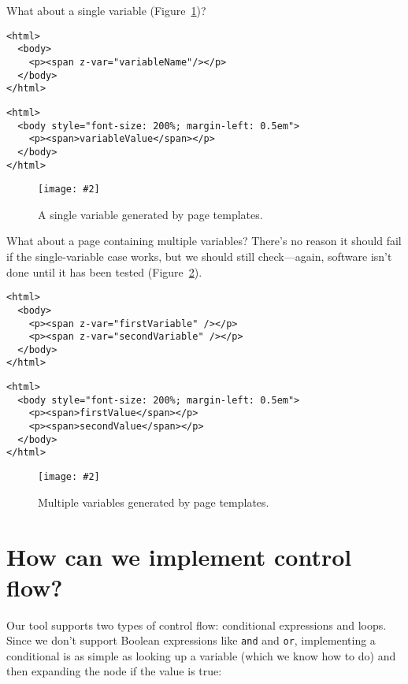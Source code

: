 \documentclass[krantzl]{krantz}
\newcommand{\figpdf}[4]{\begin{figure}%
\centering%
\texttt{[image: \#2]}%
\caption{#3}%
\label{#1}%
\end{figure}}
\newcommand{\figref}[1]{Figure~\ref{#1}}
\begin{document}
What about a single variable (\figref{page-templates-output-single-variable})?


\begin{lstlisting}[frame=tblr,backgroundcolor=\color{black!5}]
<html>
  <body>
    <p><span z-var="variableName"/></p>
  </body>
</html>
\end{lstlisting}



\begin{lstlisting}[frame=tblr,backgroundcolor=\color{black!5}]
<html>
  <body style="font-size: 200%; margin-left: 0.5em">
    <p><span>variableValue</span></p>
  </body>
</html>
\end{lstlisting}


\figpdf{page-templates-output-single-variable}{./page-templates/output-single-variable.pdf}{A single variable generated by page templates.}{0.6}


What about a page containing multiple variables?
There’s no reason it should fail if the single-variable case works,
but we should still check—again,
software isn’t done until it has been tested (\figref{page-templates-output-multiple-variables}).


\begin{lstlisting}[frame=tblr,backgroundcolor=\color{black!5}]
<html>
  <body>
    <p><span z-var="firstVariable" /></p>
    <p><span z-var="secondVariable" /></p>
  </body>
</html>
\end{lstlisting}



\begin{lstlisting}[frame=tblr,backgroundcolor=\color{black!5}]
<html>
  <body style="font-size: 200%; margin-left: 0.5em">
    <p><span>firstValue</span></p>
    <p><span>secondValue</span></p>
  </body>
</html>
\end{lstlisting}


\figpdf{page-templates-output-multiple-variables}{./page-templates/output-multiple-variables.pdf}{Multiple variables generated by page templates.}{0.6}

\section{How can we implement control flow?}\label{page-templates-flow}


Our tool supports two types of control flow:
conditional expressions and loops.
Since we don’t support Boolean expressions like \texttt{and} and \texttt{or},
implementing a conditional is as simple as looking up a variable
(which we know how to do)
and then expanding the node if the value is true:
\end{document}
